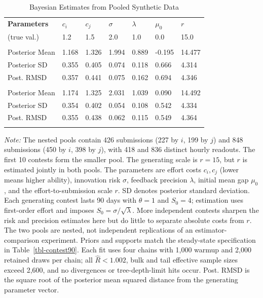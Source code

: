 \documentclass[mnsc]{informs3}
\newcommand{\figtabnotesize}{\TableSpaced\footnotesize}
\begin{document}
\begin{table}[!htbp]
\newcommand{\celltext}[1]{\leavevmode#1}
\centering
\caption{Bayesian Estimates from Pooled Synthetic Data}\label{tbl-pool-synthetic-data}
\small
\begin{tabularx}{\textwidth}{lYYYYYY}
\toprule
\textbf{Parameters} & \textbf{$c_i$} & \textbf{$c_j$} & \textbf{$\sigma$} & \textbf{$\lambda$} & \textbf{$\mu_0$} & \textbf{$r$} \\
\addlinespace[0.25ex]
\addlinespace[0.25ex]
(true val.) & 1.2 & 1.5 & 2.0 & 1.0 & 0.0 & 15.0 \\
\midrule
\addlinespace
{} \\
\celltext{Posterior Mean} & 1.168 & 1.326 & 1.994 & 0.889 & -0.195 & 14.477 \\
\celltext{Posterior SD}   & 0.355 & 0.405 & 0.074 & 0.118 & 0.666 & 4.314 \\
\celltext{Post. RMSD}     & 0.357 & 0.441 & 0.075 & 0.162 & 0.694 & 4.346 \\
\addlinespace
{} \\
\celltext{Posterior Mean} & 1.174 & 1.325 & 2.031 & 1.039 & 0.090 & 14.492 \\
\celltext{Posterior SD}   & 0.354 & 0.402 & 0.054 & 0.108 & 0.542 & 4.334 \\
\celltext{Post. RMSD}     & 0.355 & 0.438 & 0.062 & 0.115 & 0.549 & 4.364 \\
\bottomrule
\addlinespace[0.5ex]
\end{tabularx}
\begin{minipage}{\textwidth}\figtabnotesize
{\footnotesize
\textit{Note:}
The nested pools contain 426 submissions (227 by $i$, 199 by $j$) and 848 submissions (450 by $i$, 398 by $j$), with 418 and 836 distinct hourly readouts. The first 10 contests form the smaller pool. The generating scale is $r=15$, but $r$ is estimated jointly in both pools. The parameters are effort costs $c_i,c_j$ (lower means higher ability), innovation risk $\sigma$, feedback precision $\lambda$, initial mean gap $\mu_0$, and the effort-to-submission scale $r$. SD denotes posterior standard deviation. Each generating contest lasts 90 days with $\theta=1$ and $S_0=4$; estimation uses first-order effort and imposes $S_0=\sigma/\sqrt\lambda$. More independent contests sharpen the risk and precision estimates here but do little to separate absolute costs from $r$. The two pools are nested, not independent replications of an estimator-comparison experiment. Priors and supports match the steady-state specification in Table~\ref{tbl-contest90}. Each fit uses four chains with 1,000 warmup and 2,000 retained draws per chain; all $\widehat R<1.002$, bulk and tail effective sample sizes exceed 2,600, and no divergences or tree-depth-limit hits occur. {Post. RMSD is the square root of the posterior mean squared distance from the generating parameter vector.}
}
\end{minipage}
\end{table}
\end{document}
